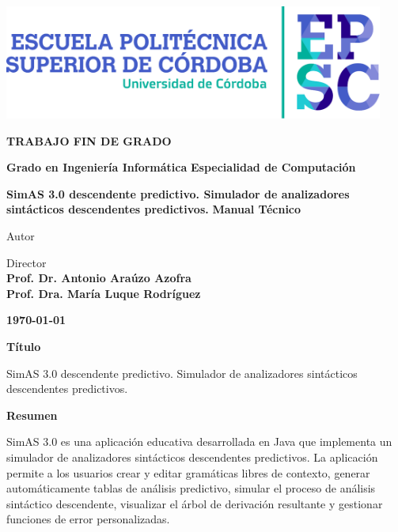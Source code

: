 \documentclass[a4paper,12pt,twoside,final]{book}
\begin{document}
\renewcommand*\listtablename{Índice de tablas}
\renewcommand{\tablename}{Tabla}
\begin{center}
\fontfamily{\sfdefault}\selectfont
\vspace*{2cm}

\vfill
\vfill
\includegraphics[width=12.5cm]{LogotipoEPSC.pdf}
\vfill
\vfill

\large\textbf{\color{epsc:medio}
  TRABAJO FIN DE GRADO
}
\vfill

\Large\textbf{\color{epsc:verde}
  Grado en Ingeniería Informática
}
\vfill
\Large\textbf{\color{epsc:verde}
  Especialidad de Computación
}
\vfill

\Huge\textbf{\color{epsc:oscuro}
  SimAS 3.0 descendente predictivo. Simulador de analizadores sintácticos descendentes predictivos.
}
\vfill
\vfill
\Large\textbf{\color{epsc:verde}
  Manual Técnico
}
\vfill
\vfill


\large{\color{epsc:oscuro}Autor}\\
\textbf{\color{epsc:medio}{D. Antonio Llamas García }}
\vfill

\large{\color{epsc:oscuro} Director }\\
\textbf{\color{epsc:medio} Prof. Dr. Antonio Araúzo Azofra}\\
\textbf{\color{epsc:medio} Prof. Dra. María Luque Rodríguez}
\vfill



\textbf{\color{epsc:verde} \monthyeardate\today}
\vfill
\vfill
\vspace{2.7cm}
\end{center}


\cleardoublepage

\thispagestyle{empty}
\pagecolor{white}

\Huge{\textbf{Título }}

\normalsize{SimAS 3.0 descendente predictivo. Simulador de analizadores sintácticos descendentes predictivos.}

\Large{\textbf{Resumen }}

\normalsize{SimAS 3.0 es una aplicación educativa desarrollada en Java que implementa un simulador de analizadores sintácticos descendentes predictivos. La aplicación permite a los usuarios crear y editar gramáticas libres de contexto, generar automáticamente tablas de análisis predictivo, simular el proceso de análisis sintáctico descendente, visualizar el árbol de derivación resultante y gestionar funciones de error personalizadas.}
\end{document}
